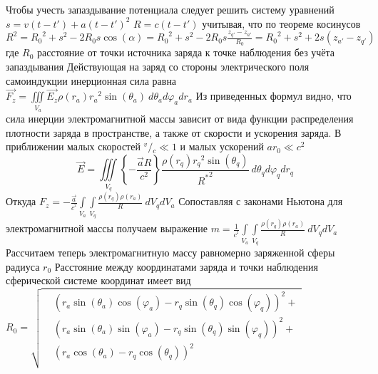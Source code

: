 ﻿\documentclass{article}
\begin{document}
Чтобы учесть запаздывание потенциала следует решить систему уравнений
$s=v\left( t-t' \right)+a{{\left( t-t' \right)}^{2}}$ 
$R=c\left( t-t' \right)$ 
учитывая, что по теореме косинусов
${{R}^{2}}={{R}_{0}}^{2}+{{s}^{2}}-2{{R}_{0}}s\cos \left( \alpha  \right)={{R}_{0}}^{2}+{{s}^{2}}-2{{R}_{0}}s\frac{{{z}_{q'}}-{{z}_{a'}}}{{{R}_{0}}}={{R}_{0}}^{2}+{{s}^{2}}+2s\left( {{z}_{a'}}-{{z}_{q'}} \right)$ 
где ${R}_{0}$ расстояние от точки источника заряда к точке наблюдения без учёта запаздывания
Действующая на заряд со стороны электрического поля самоиндукции инерционная сила равна
$\overrightarrow{{{F}_{z}}}=\iiint\limits_{{{V}_{a}}}{\overrightarrow{{{E}_{z}}}\rho \left( {{r}_{a}} \right){{r}_{a}}^{2}\sin \left( {{\theta }_{a}} \right)}\ d{{\theta }_{a}}d{{\varphi }_{a}}d{{r}_{a}}$ 
Из приведенных формул видно, что сила инерции электромагнитной массы зависит от вида функции распределения плотности заряда в пространстве, а также от скорости и ускорения заряда.
В приближении малых скоростей ${}^{v}/{}_{c}\ll 1$  и малых ускорений $a{{r}_{0}}\ll {{c}^{2}}$ 
\[\overrightarrow{E}=\iiint\limits_{{{V}_{q}}}{\left\{ -\frac{\overrightarrow{a}R}{{{c}^{2}}} \right\}\frac{\rho \left( {{r}_{q}} \right){{r}_{q}}^{2}\sin \left( {{\theta }_{q}} \right)}{{{R}^{*}}^{2}}\ }d{{\theta }_{q}}d{{\varphi }_{q}}d{{r}_{q}}\]
Откуда 
${{F}_{z}}=-\frac{\overrightarrow{a}}{{{c}^{^{2}}}}\int\limits_{{{V}_{a}}}{\int\limits_{{{V}_{q}}}{\frac{\rho \left( {{r}_{q}} \right)\rho \left( {{r}_{a}} \right)}{R}}}\ d{{V}_{q}}d{{V}_{a}}$ 
Сопоставляя с законами Ньютона для электромагнитной массы получаем выражение
$m=\frac{1}{{{c}^{^{2}}}}\int\limits_{{{V}_{a}}}{\int\limits_{{{V}_{q}}}{\frac{\rho \left( {{r}_{q}} \right)\rho \left( {{r}_{a}} \right)}{R}}}\ d{{V}_{q}}d{{V}_{a}}$
Рассчитаем теперь электромагнитную массу равномерно заряженной сферы радиуса ${{r}_{0}}$ 
Расстояние между координатами заряда и точки наблюдения сферической системе координат имеет вид
${{R}_{0}}=\sqrt{\begin{align}
  & {{\left( {{r}_{a}}\sin \left( {{\theta }_{a}} \right)\cos \left( {{\varphi }_{a}} \right)-{{r}_{q}}\sin \left( {{\theta }_{q}} \right)\cos \left( {{\varphi }_{q}} \right) \right)}^{2}}+ \\ 
 & {{\left( {{r}_{a}}\sin \left( {{\theta }_{a}} \right)\sin \left( {{\varphi }_{a}} \right)-{{r}_{q}}\sin \left( {{\theta }_{q}} \right)\sin \left( {{\varphi }_{q}} \right) \right)}^{2}}+ \\ 
 & {{\left( {{r}_{a}}\cos \left( {{\theta }_{a}} \right)-{{r}_{q}}\cos \left( {{\theta }_{q}} \right) \right)}^{2}} \\ 
\end{align}}$ 
\end{document}
